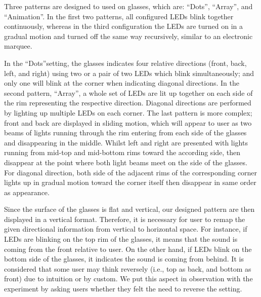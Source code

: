 \documentclass{sigchi}
\begin{document}
Three patterns are designed to used on glasses, which are: \textquotedblleft Dots\textquotedblright, \textquotedblleft Array\textquotedblright, and \textquotedblleft Animation\textquotedblright. In the first two patterns, all configured LEDs blink together continuously, whereas in the third configuration the LEDs are turned on in a gradual motion and turned off the same way recursively, similar to an electronic marquee.

In the \textquotedblleft Dots\textquotedblright  setting, the glasses indicates four relative directions (front, back, left, and right) using two or a pair of two LEDs which blink simultaneously; and only one will blink at the corner when indicating diagonal directions. In the second pattern, \textquotedblleft  Array\textquotedblright, a whole set of LEDs are lit up together on each side of the rim representing the respective direction. Diagonal directions are performed by lighting up multiple LEDs on each corner. The last pattern is more complex; front and back are displayed in sliding motion, which will appear to user as two beams of lights running through the rim entering from each side of the glasses and disappearing in the middle. Whilst left and right are presented with lights running from mid-top and mid-bottom rims toward the according side, then disappear at the point where both light beams meet on the side of the glasses. For diagonal direction, both side of the adjacent rims of the corresponding corner lights up in gradual motion toward the corner itself then disappear in same order as appearance.

Since the surface of the glasses is flat and vertical, our designed pattern are then displayed in a vertical format. Therefore, it is necessary for user to remap the given directional information from vertical to horizontal space. For instance, if LEDs are blinking on the top rim of the glasses, it means that the sound is coming from the front relative to user. On the other hand, if LEDs blink on the bottom side of the glasses, it indicates the sound is coming from behind. It is considered that some user may think reversely (i.e., top as back, and bottom as front) due to intuition or by custom. We put this aspect in observation with the experiment by asking users whether they felt the need to reverse the setting.
\end{document}
